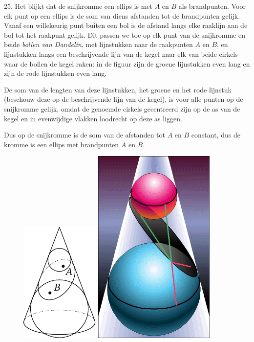 \begin{problem}{25.}
	Het blijkt dat de snijkromme een ellips is met $A$ en $B$ als brand\-punten. Voor elk punt op een ellips is de som van diens afstanden tot de brandpunten gelijk.\\

    Vanaf een willekeurig punt buiten een bol is de afstand langs elke raaklijn aan de bol tot het raakpunt gelijk. Dit passen we toe op elk punt van de snijkromme en beide \textit{bollen van Dandelin}, met lijnstukken naar de raakpunten $A$ en $B$, en lijnstukken langs een beschrijvende lijn van de kegel naar elk van beide cirkels waar de bollen de kegel raken: in de figuur zijn de groene lijnstukken even lang en zijn de rode lijnstukken even lang.

    De som van de lengten van deze lijnstukken, het groene en het rode lijnstuk (beschouw deze op de beschrijvende lijn van de kegel), is voor alle punten op de snijkromme gelijk, omdat de genoemde cirkels gecentreerd zijn op de as van de kegel en in evenwijdige vlakken loodrecht op deze as liggen.

    Dus op de snijkromme is de som van de afstanden tot $A$ en $B$ constant, dus de kromme is een ellips met brandpunten $A$ en $B$.
    \begin{figure}
		\includegraphics{resources/taskbook-9}
        \hspace{2cm}
		\includegraphics[scale=0.4]{resources/DandelinSpheres}

	\end{figure}
\end{problem}

